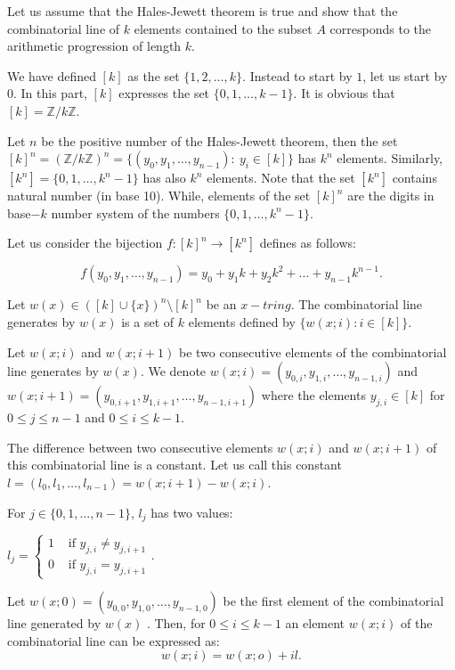 Let us  assume that the Hales-Jewett theorem is true and show that the combinatorial line of $k$ elements contained to the subset $A$ corresponds to the arithmetic progression of length $k$.

We have defined $[k]$ as the set $\{1,2,\ldots, k\}.$ Instead to start by $1$, let us start by $0.$ In this part, $[k]$ expresses the set $\{0,1,\ldots, k-1\}.$ It is obvious that $[k]=\mathbb{Z}/k\mathbb{Z}.$

Let $n$ be the positive number of the Hales-Jewett theorem, then the set $[k]^n=(\mathbb{Z}/k\mathbb{Z})^n=\{(y_0,y_1, \ldots, y_{n-1}): \ y_i \in [k] \}$ has $k^n$ elements. Similarly, $[k^n]=\{0,1,\ldots, k^n-1\}$ has also $k^n$ elements. Note that the set $[k^n]$ contains natural number (in base 10).
While, elements of the set $[k]^n$ are
the digits  in base$-k$ number system of the numbers $\{0,1,\ldots,k^n-1\}.$

Let us consider the bijection $f:[k]^n \longrightarrow [k^n]$ defines as follows:

$$f(y_0,y_1,\ldots, y_{n-1})=y_0+y_1k+y_2 k^2+\ldots+y_{n-1}k^{n-1}.$$

Let $w(x) \in ([k] \cup \{x\})^n\setminus [k]^n$ be an $x-tring.$ The combinatorial line generates by $w(x)$ is a set of $k$ elements defined by  $\{w(x;i):i\in [k]\}.$

Let $w(x;i)$ and $w(x;i+1)$ be two consecutive elements of the combinatorial line generates by $w(x)$. We denote  $w(x;i)=(y_{0,i},y_{1,i},\ldots, y_{n-1,i}) $ and $w(x;i+1)=(y_{0,i+1},y_{1,i+1},\ldots, y_{n-1,i+1})$ where  the elements  $y_{j,i} \in [k]$ for $0 \leq j \leq n-1$ and $0 \leq i \leq k-1.$

The difference
between two consecutive elements $w(x;i)$ and $w(x;i+1)$
of this combinatorial line is a constant. Let us call this constant $l=(l_0, l_1, \ldots, l_{n-1})= w(x;i+1)-w(x;i)$.


For $j\in \{0,1,\ldots, n-1\}$, $l_j$ has two values:

$l_j= \left\lbrace \begin{array}{ll}1 & \text{ if } y_{j,i}\neq y_{j,i+1} \\ 0 & \text{ if } y_{j,i} =  y_{j,i+1}   \end{array} \right. .$

Let $w(x;0)=(y_{0,0},y_{1,0},\ldots, y_{n-1,0})$ be the first element of the combinatorial line generated by $w(x)$ . Then, for $0\leq i \leq k-1$ an element $w(x;i)$ of the combinatorial line can be expressed as: $$w(x;i)=w(x;o)+il.$$

